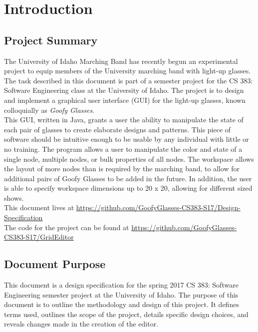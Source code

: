 \documentclass[12pt]{article}
\begin{document}
	\tableofcontents
	\newpage
	
	\section{Introduction}
		\subsection{Project Summary}
  		The University of Idaho Marching Band has recently begun an experimental project to equip members of the University marching band with light-up glasses. The task described in this document is part of a semester project for the CS 383: Software Engineering class at the University of Idaho.  The project is to design and implement a graphical user interface (GUI) for the light-up glasses, known colloquially as \textit{Goofy Glasses}. 
      \\
      This GUI, written in Java, grants a user the ability to manipulate the state of each pair of glasses to create elaborate designs and patterns. This piece of software should be intuitive enough to be usable by any individual with little or no training. The program allows a user to manipulate the color and state of a single node, multiple nodes, or bulk properties of all nodes. The workspace allows the layout of more nodes than is required by the marching band, to allow for additional pairs of Goofy Glasses to be added in the future. In addition, the user is able to specify workspace dimensions up to 20 x 20, allowing for different sized shows. 
      \\
      This document lives at \url{https://github.com/GoofyGlasses-CS383-S17/Design-Specification} 
      \\
      The code for the project can be found at \url{https://github.com/GoofyGlasses-CS383-S17/GridEditor}
		
		\subsection{Document Purpose}
  		This document is a design specification for the spring 2017 CS 383: Software Engineering semester project at the University of Idaho. The purpose of this document is to outline the methodology and design of this project. It defines terms used, outlines the scope of the project, details specific design choices, and reveals changes made in the creation of the editor. 
		
\end{document}
